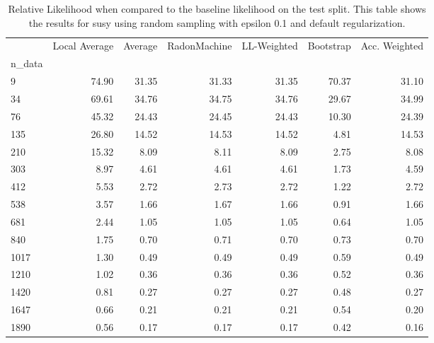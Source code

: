\begin{table}
\centering
\caption{Relative Likelihood when compared to the baseline likelihood on the test split. This table shows the results for  susy using  random sampling with epsilon  0.1 and  default regularization.}
\label{tab:8}
\begin{tabular}{lrrrrrr}
\toprule
{} &  Local Average &  Average &  RadonMachine &  LL-Weighted &  Bootstrap &  Acc. Weighted \\
n\_data &                &          &               &              &            &                \\
\midrule
9      &          74.90 &    31.35 &         31.33 &        31.35 &      70.37 &          31.10 \\
34     &          69.61 &    34.76 &         34.75 &        34.76 &      29.67 &          34.99 \\
76     &          45.32 &    24.43 &         24.45 &        24.43 &      10.30 &          24.39 \\
135    &          26.80 &    14.52 &         14.53 &        14.52 &       4.81 &          14.53 \\
210    &          15.32 &     8.09 &          8.11 &         8.09 &       2.75 &           8.08 \\
303    &           8.97 &     4.61 &          4.61 &         4.61 &       1.73 &           4.59 \\
412    &           5.53 &     2.72 &          2.73 &         2.72 &       1.22 &           2.72 \\
538    &           3.57 &     1.66 &          1.67 &         1.66 &       0.91 &           1.66 \\
681    &           2.44 &     1.05 &          1.05 &         1.05 &       0.64 &           1.05 \\
840    &           1.75 &     0.70 &          0.71 &         0.70 &       0.73 &           0.70 \\
1017   &           1.30 &     0.49 &          0.49 &         0.49 &       0.59 &           0.49 \\
1210   &           1.02 &     0.36 &          0.36 &         0.36 &       0.52 &           0.36 \\
1420   &           0.81 &     0.27 &          0.27 &         0.27 &       0.48 &           0.27 \\
1647   &           0.66 &     0.21 &          0.21 &         0.21 &       0.54 &           0.20 \\
1890   &           0.56 &     0.17 &          0.17 &         0.17 &       0.42 &           0.16 \\
\bottomrule
\end{tabular}
\end{table}
